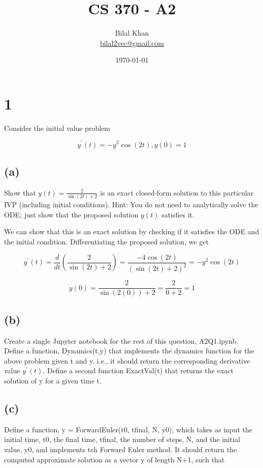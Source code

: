 \documentclass[11pt]{article}
\title{CS 370 - A2}
\author{Bilal Khan\\
\href{mailto:bilal2vec@gmail.com}{bilal2vec@gmail.com}}
\date{\today}
\begin{document}
\maketitle

\tableofcontents

\section{1}

Consider the initial value problem

\[ y^\prime(t) = -y^2 \cos(2t), y(0) = 1 \]

\subsection{(a)}

Show that $y(t) = \frac{2}{\sin(2t) + 2}$ is an exact closed-form solution to this particular IVP (including initial conditions). Hint: You do not need to analytically solve the ODE; just show that the proposed solution $y(t)$ satisfies it.

We can show that this is an exact solution by checking if it satisfies the ODE and the initial condition. Differentiating the proposed solution, we get

\[ y^\prime(t) = \frac{d}{dt} \left( \frac{2}{\sin(2t) + 2} \right) = \frac{-4 \cos(2t)}{(\sin(2t) + 2)^2} = -y^2 \cos(2t) \]

\[ y(0) = \frac{2}{\sin(2 (0)) + 2} = \frac{2}{0 + 2} = 1 \]

\subsection{(b)}

Create a single Jupyter notebook for the rest of this question, A2Q1.ipynb. Define a function, Dynamics(t,y) that implements the dynamics function for the above problem given t and y. i.e., it should return the corresponding derivative value $y^\prime(t)$. Define a second function ExactVal(t) that returns the exact solution of y for a given time t.

\subsection{(c)}

Define a function, y = ForwardEuler(t0, tfinal, N, y0), which takes as input the initial time, t0, the final time, tfinal, the number of steps, N, and the initial value, y0, and implements teh Forward Euler method. It should return the computed approximate solution as a vector y of length N+1, such that
\end{document}
